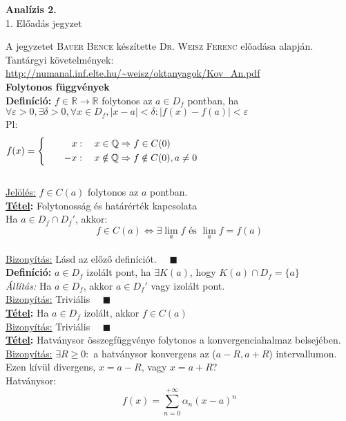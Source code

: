\documentclass[a4paper,11pt]{article}
\begin{document}
\def\biz{\normalsize{\textbf{\underline{Bizonyítás:} }\hspace*{0.3cm}}}
\def\tetel{\large \textbf{Tétel: }}
\def\defi{\normalsize \textbf{Definíció: }}
\def\Z{\mathbb{Z}}
\def\Q{\mathbb{Q}}
\def\R{\mathbb{R}}
\def\N{\mathbb{N}}
\def\sume{\displaystyle\sum_{n=1}^{+\infty}}
\def\sumn{\displaystyle\sum_{n=0}^{+\infty}}
\def\biz{\normalsize{\underline{Bizonyítás:} }\hspace*{0.5cm}}
\def\tetel{\normalsize \textbf{\underline{Tétel}: }}
\def\narrow{\underset{n\rightarrow+\infty}{\longrightarrow}}
\def\limn{\displaystyle\lim_{n\to +\infty}}
\begin{center}
	{\LARGE\textbf{Analízis 2.}}\\[0.2cm]
	
	{\Large 1. Előadás jegyzet}\\[1cm]	
\end{center}
{\small A jegyzetet \textsc{Bauer Bence} készítette \textsc{Dr. Weisz Ferenc} előadása alapján.}\\[0.2cm]
Tantárgyi követelmények: \url{http://numanal.inf.elte.hu/~weisz/oktanyagok/Kov_An.pdf}\\[0.2cm]
\textbf{{\large Folytonos függvények}}\\[0.1cm]
\defi $f\in\R\to\R$ folytonos az $a\in D_f$ pontban, ha\\[0.2cm] $\forall\varepsilon>0,\exists\delta>0,\forall x\in D_f, |x-a|<\delta : |f(x)-f(a)|<\varepsilon$\\[0.1cm] Pl: \[\displaystyle f(x) = 
\left\{
\begin{gathered}
x: \quad x\in\Q\Rightarrow f\in C(0)\hspace{5.7cm} \\
\quad\quad-x: \quad x\notin\Q\Rightarrow f\notin C(0), a\neq 0\hspace{5.7cm}
\end{gathered}\right. \]\\[0.1cm]
\underline{Jelölés:}  $f\in C(a)$ folytonos az $a$ pontban.\\[0.2cm]
\tetel Folytonosság és határérték kapcsolata\\[0.1cm]
Ha $a\in D_f\cap D_f'$, akkor: \[ f\in C(a)\Leftrightarrow \exists\lim_a f \text{ és } \lim_a f=f(a)\]\\[0.1cm]
\biz Lásd az előző definíciót. $\quad\blacksquare$\\[0.3cm]
\defi $a\in D_f$ izolált pont, ha $\exists K(a)$, hogy $K(a)\cap D_f=\{a\}$\\[0.1cm] \textit{Állítás:} Ha $a\in D_f$, akkor $a\in D_f'$ vagy izolált pont.\\[0.1cm]\biz Triviális $\quad\blacksquare$\\[0.2cm] \tetel Ha $a\in D_f$ izolált, akkor $f\in C(a)$\\[0.1cm]\biz Triviális $\quad\blacksquare$\\[0.2cm] \tetel Hatványsor összegfüggvénye folytonos a konvergenciahalmaz belsejében.\\[0.1cm] \biz $\exists R\geq0:$ a hatványsor konvergens az ($a-R,a+R$) intervallumon.\\[0.1cm]Ezen kívül divergens, $x=a-R$, vagy $x=a+R$?\\[0.1cm]Hatványsor:\[f(x)=\sumn \alpha_n(x-a)^n\]
\end{document}
